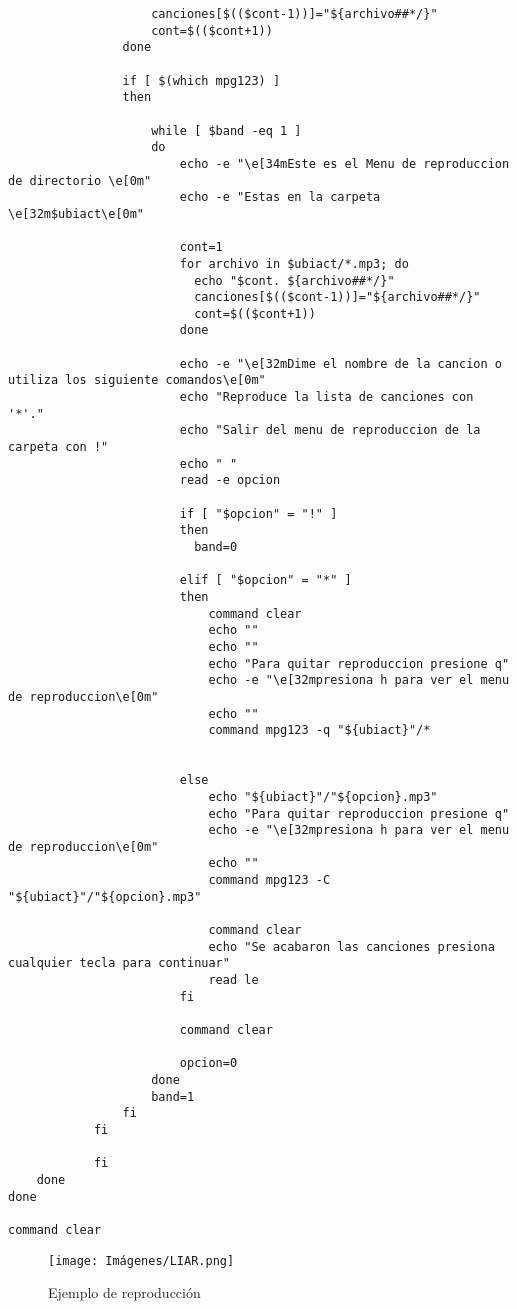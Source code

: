 \documentclass[letterpaper,12pt]{article} %
\begin{document}
\begin{itemize}
\begin{lstlisting}
		        	canciones[$(($cont-1))]="${archivo##*/}"
		        	cont=$(($cont+1))
		        done

		        if [ $(which mpg123) ]
		        then

			        while [ $band -eq 1 ]
			        do
			        	echo -e "\e[34mEste es el Menu de reproduccion de directorio \e[0m"
			            echo -e "Estas en la carpeta \e[32m$ubiact\e[0m"

			            cont=1
			            for archivo in $ubiact/*.mp3; do
			              echo "$cont. ${archivo##*/}"
			              canciones[$(($cont-1))]="${archivo##*/}"
			              cont=$(($cont+1))
			            done

			            echo -e "\e[32mDime el nombre de la cancion o utiliza los siguiente comandos\e[0m"
			            echo "Reproduce la lista de canciones con  '*'."
			            echo "Salir del menu de reproduccion de la carpeta con !"
			            echo " "
			            read -e opcion

			            if [ "$opcion" = "!" ]
			            then
			              band=0

			            elif [ "$opcion" = "*" ]
			            then
				            command clear
				            echo ""
				            echo ""
				            echo "Para quitar reproduccion presione q"
				            echo -e "\e[32mpresiona h para ver el menu de reproduccion\e[0m"
				            echo ""
				            command mpg123 -q "${ubiact}"/*


			            else
				            echo "${ubiact}"/"${opcion}.mp3"
				            echo "Para quitar reproduccion presione q"
				            echo -e "\e[32mpresiona h para ver el menu de reproduccion\e[0m"
				            echo ""
				            command mpg123 -C "${ubiact}"/"${opcion}.mp3"

				            command clear 
				            echo "Se acabaron las canciones presiona cualquier tecla para continuar"
				            read le
			            fi

			            command clear

			            opcion=0
			        done
		        	band=1
		        fi
		    fi
			
			fi
	done
done

command clear
\end{lstlisting}
\end{itemize}

 \begin{figure}[H]
\caption{Ejemplo de reproducción}
\centering
\texttt{[image: Imágenes/LIAR.png]}
\end{figure}
\end{document}
